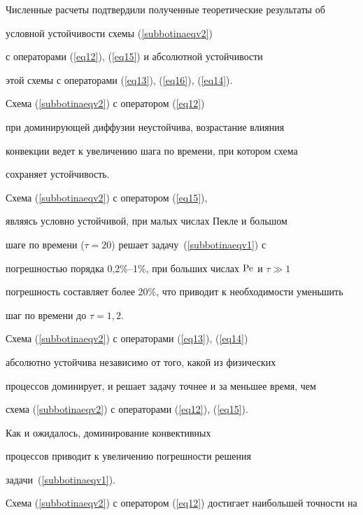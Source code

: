 Численные расчеты подтвердили полученные теоретические результаты об 


условной устойчивости схемы (\ref{subbotinaeqv2})


с операторами (\ref{eq12}), (\ref{eq15}) и абсолютной устойчивости 


этой схемы с операторами (\ref{eq13}), (\ref{eq16}), (\ref{eq14}).





Схема (\ref{subbotinaeqv2}) с оператором (\ref{eq12})


при доминирующей диффузии неустойчива, возрастание влияния 


конвекции ведет к увеличению шага по времени, при котором схема 


сохраняет устойчивость.





Схема (\ref{subbotinaeqv2}) с оператором (\ref{eq15}),


являясь условно устойчивой, при малых числах Пекле и большом 


шаге по времени ($\tau =20$) решает задачу~(\ref{subbotinaeqv1}) с 


погрешностью порядка 0{,}2\%--1\%, при больших числах $\operatorname{Pe}$ и $\tau \gg 1$


погрешность составляет более 20\%, что приводит к необходимости уменьшить 


шаг по времени до $\tau =1{,}2$.





Схема (\ref{subbotinaeqv2}) с операторами (\ref{eq13}), (\ref{eq14})


абсолютно устойчива независимо от того, какой из физических 


процессов доминирует, и решает задачу точнее и за меньшее время, чем 


схема (\ref{subbotinaeqv2}) с операторами (\ref{eq12}), (\ref{eq15}).





Как и ожидалось, доминирование конвективных 


процессов приводит к увеличению погрешности решения


задачи~(\ref{subbotinaeqv1}).





Схема (\ref{subbotinaeqv2}) с оператором (\ref{eq12}) достигает наибольшей точности на 


